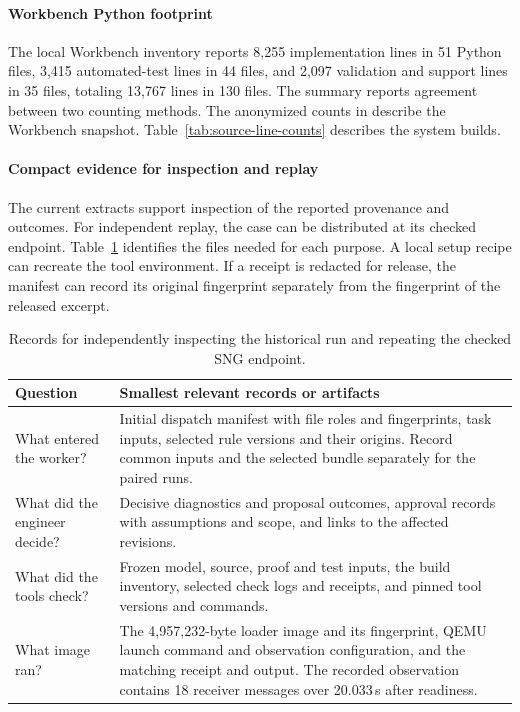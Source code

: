 \paragraph{Workbench Python footprint}
The local Workbench inventory reports 8,255 implementation lines in 51 Python files, 3,415 automated-test lines in 44 files, and 2,097 validation and support lines in 35 files, totaling 13,767 lines in 130 files. The summary reports agreement between two counting methods. The anonymized counts in  describe the Workbench snapshot. Table~\ref{tab:source-line-counts} describes the system builds.

\paragraph{Compact evidence for inspection and replay}
The current extracts support inspection of the reported provenance and outcomes. For independent replay, the case can be distributed at its checked endpoint. Table~\ref{tab:endpoint-package} identifies the files needed for each purpose. A local setup recipe can recreate the tool environment. If a receipt is redacted for release, the manifest can record its original fingerprint separately from the fingerprint of the released excerpt.

\begin{table}[!htbp]
\caption{Records for independently inspecting the historical run and repeating the checked SNG endpoint.}
\label{tab:endpoint-package}
\centering\small
\begin{tabular}{@{}>{\raggedright\arraybackslash}p{.23\linewidth}>{\raggedright\arraybackslash}p{.71\linewidth}@{}}
\toprule
Question & Smallest relevant records or artifacts \\
\midrule
What entered the worker? & Initial dispatch manifest with file roles and fingerprints, task inputs, selected rule versions and their origins. Record common inputs and the selected bundle separately for the paired runs. \\
What did the engineer decide? & Decisive diagnostics and proposal outcomes, approval records with assumptions and scope, and links to the affected revisions. \\
What did the tools check? & Frozen model, source, proof and test inputs, the build inventory, selected check logs and receipts, and pinned tool versions and commands. \\
What image ran? & The 4,957,232-byte loader image and its fingerprint, QEMU launch command and observation configuration, and the matching receipt and output. The recorded observation contains 18 receiver messages over 20.033\,s after readiness. \\
\bottomrule
\end{tabular}
\end{table}

